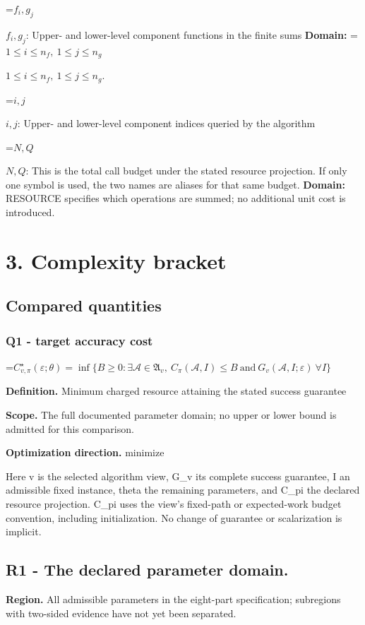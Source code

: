 \documentclass[10pt,a4paper]{article}
\newcommand{\AtlasMath}[1]{\par\begingroup\centering\setbox0=\hbox{$\displaystyle #1$}\ifdim\wd0>1.4\linewidth\typeout{ATLAS WIDE FORMULA: \the\wd0}\fi\ifdim\wd0>\linewidth\resizebox{\linewidth}{!}{\box0}\else\box0\fi\par\endgroup}
\newcommand{\AtlasInlineMath}[1]{\begingroup\setbox0=\hbox{$#1$}\ifdim\wd0>.4\linewidth\endgroup\AtlasMath{#1}\else\endgroup$#1$\fi}
\begin{document}
\AtlasInlineMath{f_i,g_j}: Upper- and lower-level component functions in the finite sums \textbf{Domain:} \AtlasInlineMath{1\le i\le n_f,\ 1\le j\le n_g}.

\AtlasInlineMath{i,j}: Upper- and lower-level component indices queried by the algorithm

\AtlasInlineMath{N,Q}: This is the total call budget under the stated resource projection. If only one symbol is used, the two names are aliases for that same budget. \textbf{Domain:} RESOURCE specifies which operations are summed; no additional unit cost is introduced.

\section{3. Complexity bracket}
\subsection{Compared quantities}
\subsubsection{Q1 - target accuracy cost}
\AtlasMath{C^\star_{v,\pi}(\varepsilon;\theta)=\inf\{B\ge0:\exists\mathcal A\in\mathfrak A_v,\ C_\pi(\mathcal A,I)\le B\ \text{and}\ G_v(\mathcal A,I;\varepsilon)\ \forall I\}}
\textbf{Definition.} Minimum charged resource attaining the stated success guarantee

\textbf{Scope.} The full documented parameter domain; no upper or lower bound is admitted for this comparison.

\textbf{Optimization direction.} minimize

Here v is the selected algorithm view, G\_v its complete success guarantee, I an admissible fixed instance, theta the remaining parameters, and C\_pi the declared resource projection. C\_pi uses the view's fixed-path or expected-work budget convention, including initialization. No change of guarantee or scalarization is implicit.

\subsection{R1 - The declared parameter domain.}
\textbf{Region.} All admissible parameters in the eight-part specification; subregions with two-sided evidence have not yet been separated.
\end{document}
